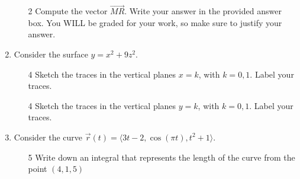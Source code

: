 \documentclass[addpoints,12pt]{exam}
\begin{document}
\begin{enumerate}
\begin{itemize}
\begin{flushright}
\end{flushright}
\item[2] Compute the vector $\overrightarrow{MR}$. Write your answer in the provided answer
box. You WILL be graded for your work, so make sure to justify your answer.
\vfill
\vfill
\vspace{0.1in}
\begin{flushright}
\end{flushright}
\end{itemize}
\newpage
\item Consider the surface $y =x^2 + 9z^2$.
\begin{itemize}
\item[4] Sketch the traces in the vertical planes $x = k$, with $ k =0, 1$. Label your traces.
\begin{center}
\end{center}
\vfill
\item[4] Sketch the traces in the vertical planes $y = k$, with $ k =0, 1 $. Label your traces.
\begin{center}
\end{center}
\vfill
\end{itemize}
\newpage
\item Consider the curve $\vec{r}(t) = \langle 3t-2, \cos(\pi t), t^2 +1 \rangle.$
\begin{itemize}
\item[5] Write down an integral that represents the length of the curve from the point $(4, 1, 5)$

\end{itemize}
\end{enumerate}
\end{document}
